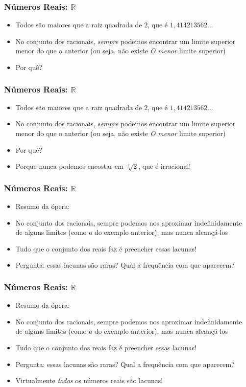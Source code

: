 \documentclass[usenames,dvipsnames,svgnames]{beamer}
\begin{document}
\begin{frame}	
	\frametitle{Números Reais: $\mathbb{R}$}

	\begin{itemize}
		\item Todos são maiores que a raiz quadrada de $2$, que é $1,414213562\dots$
		\item No conjunto dos racionais, \emph{sempre} podemos encontrar um limite superior menor do que o anterior (ou seja, não existe \emph{O menor} limite superior)
		\item Por quê?
	\end{itemize}
\end{frame}

\begin{frame}	
	\frametitle{Números Reais: $\mathbb{R}$}

	\begin{itemize}
		\item Todos são maiores que a raiz quadrada de $2$, que é $1,414213562\dots$
		\item No conjunto dos racionais, \emph{sempre} podemos encontrar um limite superior menor do que o anterior (ou seja, não existe \emph{O menor} limite superior)
		\item Por quê?
		\item Porque nunca podemos encostar em $\sqrt[2]{2}$, que é irracional!
	\end{itemize}
\end{frame}

\begin{frame}	
	\frametitle{Números Reais: $\mathbb{R}$}

	\begin{itemize}
		\item Resumo da ópera:
		\item No conjunto dos racionais, sempre podemos nos aproximar indefinidamente de alguns limites (como o do exemplo anterior), mas nunca alcançá-los
		\item Tudo que o conjunto dos reais faz é preencher essas lacunas!
		\item Pergunta: essas lacunas são raras? Qual a frequência com que aparecem?
	\end{itemize}
\end{frame}

\begin{frame}	
	\frametitle{Números Reais: $\mathbb{R}$}

	\begin{itemize}
		\item Resumo da ópera:
		\item No conjunto dos racionais, sempre podemos nos aproximar indefinidamente de alguns limites (como o do exemplo anterior), mas nunca alcançá-los
		\item Tudo que o conjunto dos reais faz é preencher essas lacunas!
		\item Pergunta: essas lacunas são raras? Qual a frequência com que aparecem?
		\item {\color{red} Virtualmente \emph{todos} os números reais são lacunas!}
	\end{itemize}
\end{frame}
\end{document}
